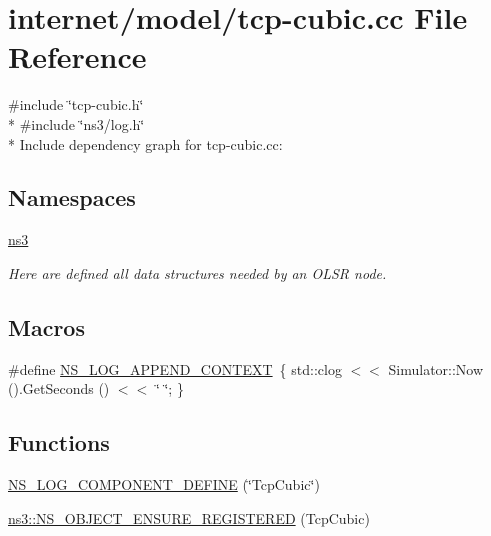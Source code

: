 \hypertarget{tcp-cubic_8cc}{}\section{internet/model/tcp-\/cubic.cc File Reference}
\label{tcp-cubic_8cc}
{\ttfamily \#include \char`\"{}tcp-\/cubic.\+h\char`\"{}}\\*
{\ttfamily \#include \char`\"{}ns3/log.\+h\char`\"{}}\\*
Include dependency graph for tcp-\/cubic.cc\+:
\subsection*{Namespaces}
\begin{DoxyCompactItemize}
\item 
 \hyperlink{namespacens3}{ns3}
\begin{DoxyCompactList}\small\item\em Here are defined all data structures needed by an O\+L\+SR node. \end{DoxyCompactList}\end{DoxyCompactItemize}
\subsection*{Macros}
\begin{DoxyCompactItemize}
\item 
\#define \hyperlink{tcp-cubic_8cc_abe50035652d407c40bdaef78214c4955}{N\+S\+\_\+\+L\+O\+G\+\_\+\+A\+P\+P\+E\+N\+D\+\_\+\+C\+O\+N\+T\+E\+XT}~\{ std\+::clog $<$$<$ Simulator\+::\+Now ().Get\+Seconds () $<$$<$ \char`\"{} \char`\"{}; \}
\end{DoxyCompactItemize}
\subsection*{Functions}
\begin{DoxyCompactItemize}
\item 
\hyperlink{tcp-cubic_8cc_ad1f204a7bd6f8b963b1f3821e9431dc9}{N\+S\+\_\+\+L\+O\+G\+\_\+\+C\+O\+M\+P\+O\+N\+E\+N\+T\+\_\+\+D\+E\+F\+I\+NE} (\char`\"{}Tcp\+Cubic\char`\"{})
\item 
\hyperlink{namespacens3_a87cb7e88b56d3d11a92e5a98bbb9716c}{ns3\+::\+N\+S\+\_\+\+O\+B\+J\+E\+C\+T\+\_\+\+E\+N\+S\+U\+R\+E\+\_\+\+R\+E\+G\+I\+S\+T\+E\+R\+ED} (Tcp\+Cubic)
\end{DoxyCompactItemize}



